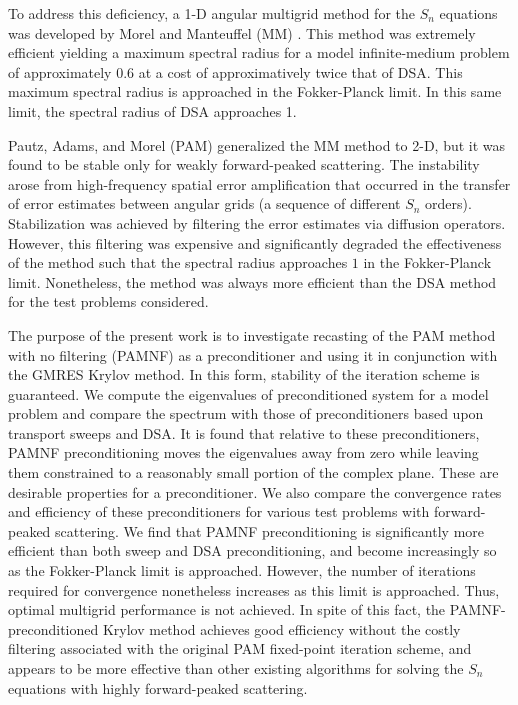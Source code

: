 \documentclass[preprint,10pt]{elsarticle}
\renewcommand{\(}{\left(}
\renewcommand{\)}{\right)}
\renewcommand{\[}{\left[}
\renewcommand{\]}{\right]}
\begin{document}
To address this deficiency, a 1-D angular multigrid method for the $S_n$
equations was developed by Morel and Manteuffel (MM) \cite{multigrid_1d}. This
method was extremely efficient yielding a maximum spectral radius for 
a model infinite-medium problem of approximately 0.6 at a cost of
approximatively twice that of DSA. This maximum spectral radius is approached
in the Fokker-Planck limit. In this same limit, the spectral radius of DSA
approaches 1. 

Pautz, Adams, and Morel (PAM) \cite{multigrid_2d} generalized the MM method to
2-D, but it was found to be stable only for weakly forward-peaked scattering.
The instability arose from high-frequency spatial error amplification that
occurred in the transfer of error estimates between angular grids (a sequence
of different $S_n$ orders). Stabilization was achieved by filtering the error
estimates via diffusion operators. However, this filtering was expensive and
significantly degraded the effectiveness of the method such that the spectral
radius approaches $1$ in the Fokker-Planck limit.  Nonetheless, the method was 
always more efficient than the DSA method for the test problems considered.


The purpose of the present work is to investigate recasting of the PAM method
with no filtering (PAMNF) as a preconditioner and using it in conjunction with
the GMRES Krylov method. In this form, stability of the iteration scheme is
guaranteed. We compute the eigenvalues of preconditioned system for a model
problem and compare the spectrum with those of preconditioners based upon transport
sweeps and DSA. It is found that relative to these preconditioners,
PAMNF preconditioning moves the eigenvalues away from zero while leaving them
constrained to a reasonably small portion of the complex plane. These are
desirable properties for a preconditioner. We also compare the convergence
rates and efficiency of these preconditioners for various test problems with
forward-peaked scattering. We find that PAMNF preconditioning
is significantly more efficient than both sweep and DSA
preconditioning, and become increasingly so as the Fokker-Planck limit is
approached. However, the number of iterations required for convergence
nonetheless increases as this limit is approached. Thus, optimal multigrid
performance is not achieved. In spite of this fact, the PAMNF-preconditioned
Krylov method achieves good efficiency without the costly filtering associated
with the original PAM fixed-point iteration scheme, and appears to be more
effective than other existing algorithms for solving the $S_n$ equations with
highly forward-peaked scattering.
\end{document}
